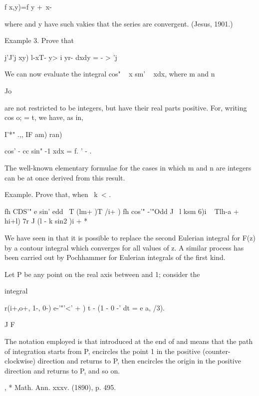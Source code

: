 f x,y)=f y + \,x-\ \

where and y have such vakies that the series are convergent. (Jesus,
1901.)

Example 3. Prove that

j'J'j xy) l-xT- y> i yr- dxdy = - > 'j



We can now evaluate the integral cos" ~ x sm' ~ xdx, where m and n

Jo

are not restricted to be integers, but have their real parts positive.
For, writing cos o; = t, we have, as in,

I'*" .,, IF am) ran)

cos' - cc sin" -1 xdx = f. ' - .

The well-known elementary formulae for the cases in which m and n are
integers can be at once derived from this result.

Example. Prove that, when \ k\ < .\,

fh CDS'" e sin' edd \ T (lm+ )T /i+ ) fh cos'" -'"Odd J \ l ksm 6)i ~
Tlh-a + hi+l) 7r J (l - k sin2 )i + *



We have seen in that it is possible to replace the second
Eulerian integral for F(z) by a contour integral which converges for
all values of z. A similar process has been carried out by Pochhammer
for Eulerian integrals of the first kind.

Let P be any point on the real axis between and 1; consider the

integral

r(i+,o+, 1-, 0-) e-'"'<' + ) t - (1 - 0 -' dt = e a, /3).

J F

The notation employed is that introduced at the end of and
means that the path of integration starts from P, encircles the point
1 in the positive (counter-clockwise) direction and returns to P, then
encircles the origin in the positive direction and returns to P, and
so on.

, * Math. Ann. xxxv. (1890), p. 495.

